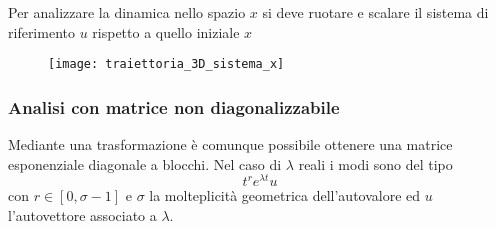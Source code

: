 \newpage
Per analizzare la dinamica nello spazio $x$ si deve ruotare e scalare il
sistema di riferimento $u$ rispetto a quello iniziale $x$
\begin{figure}[H]
 \centering
 \texttt{[image: traiettoria\_3D\_sistema\_x]}
\end{figure}

\subsubsection{Analisi con matrice non diagonalizzabile}
Mediante una trasformazione è comunque possibile ottenere una matrice
esponenziale diagonale a blocchi.
Nel caso di $\lambda$ reali i modi sono del tipo
$$
t^r e^{\lambda t} u
$$
con $r\in[0,\sigma-1]$ e $\sigma$ la molteplicità geometrica dell'autovalore ed
$u$ l'autovettore associato a $\lambda$.

